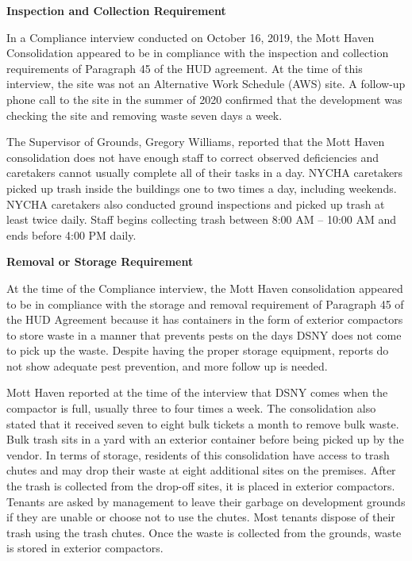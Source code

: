 

\textbf{Inspection and Collection Requirement}

In a Compliance interview conducted on October 16, 2019, the Mott Haven Consolidation appeared to be in compliance with the inspection and collection requirements of Paragraph 45 of the HUD agreement. At the time of this interview, the site was not an Alternative Work Schedule (AWS) site. A follow-up phone call to the site in the summer of 2020 confirmed that the development was checking the site and removing waste seven days a week.

The Supervisor of Grounds, Gregory Williams, reported that the Mott Haven consolidation does not have enough staff to correct observed deficiencies and caretakers cannot usually complete all of their tasks in a day. NYCHA caretakers picked up trash inside the buildings one to two times a day, including weekends. NYCHA caretakers also conducted ground inspections and picked up trash at least twice daily. Staff begins collecting trash between 8:00 AM -- 10:00 AM and ends before 4:00 PM daily.

\textbf{Removal or Storage Requirement}

At the time of the Compliance interview, the Mott Haven consolidation appeared to be in compliance with the storage and removal requirement of Paragraph 45 of the HUD Agreement because it has containers in the form of exterior compactors to store waste in a manner that prevents pests on the days DSNY does not come to pick up the waste. Despite having the proper storage equipment, reports do not show adequate pest prevention, and more follow up is needed.

Mott Haven reported at the time of the interview that DSNY comes when the compactor is full, usually three to four times a week. The consolidation also stated that it received seven to eight bulk tickets a month to remove bulk waste. Bulk trash sits in a yard with an exterior container before being picked up by the vendor. In terms of storage, residents of this consolidation have access to trash chutes and may drop their waste at eight additional sites on the premises. After the trash is collected from the drop-off sites, it is placed in exterior compactors. Tenants are asked by management to leave their garbage on development grounds if they are unable or choose not to use the chutes. Most tenants dispose of their trash using the trash chutes. Once the waste is collected from the grounds, waste is stored in exterior compactors.  

